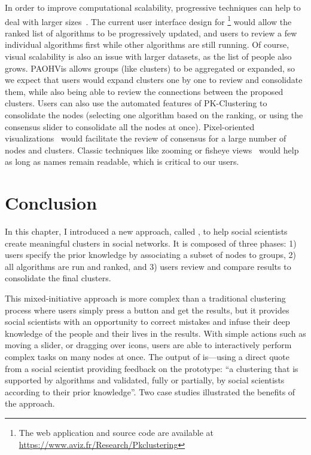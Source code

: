 In order to improve computational scalability, progressive techniques can help to deal with larger sizes~\cite{Progressive}.
The current user interface design for \pkclustering\footnote{The web application and source code are available at \url{https://www.aviz.fr/Research/Pkclustering}} would allow the ranked list of algorithms to be progressively updated, and users to review a few individual algorithms first while other algorithms are still running.  Of course, visual scalability is also an issue with larger datasets, as the list of people also grows.
PAOHVis allows groups (like clusters) to be aggregated or expanded, so we expect that users would expand clusters one by one to review and consolidate them, while also being able to review the connections between the proposed clusters.
Users can also use the automated features of PK-Clustering to consolidate the nodes (\eg selecting one algorithm based on the ranking, or using the consensus slider to consolidate all the nodes at once).
Pixel-oriented visualizations~\cite{keim2000pixel} would facilitate the review of consensus for a large number of nodes and clusters.
Classic techniques like zooming or fisheye views~\cite{Jakobsen06-fisheye, rao94} would help as long as names remain readable, which is critical to our users.

\section{Conclusion}

In this chapter, I introduced a new approach, called \pkclustering, to help social scientists create meaningful clusters in social networks. It is composed of three phases: 1) users specify the prior knowledge by associating a subset of nodes to groups, 2) all algorithms are run and ranked, and 3) users review and compare results to consolidate the final clusters.

This mixed-initiative approach is more complex than a traditional clustering process where users simply press a button and get the results, but it provides social scientists with an opportunity to correct mistakes and infuse their deep knowledge of the people and their lives in the results.
With simple actions such as moving a slider, or dragging over icons, users are able to interactively perform complex tasks on many nodes at once. The output of \pkclustering is---using a direct quote from a social scientist providing feedback on the prototype:  ``a clustering that is supported by algorithms and validated, fully or partially, by social scientists according to their prior knowledge''. Two case studies illustrated the benefits of the approach.

